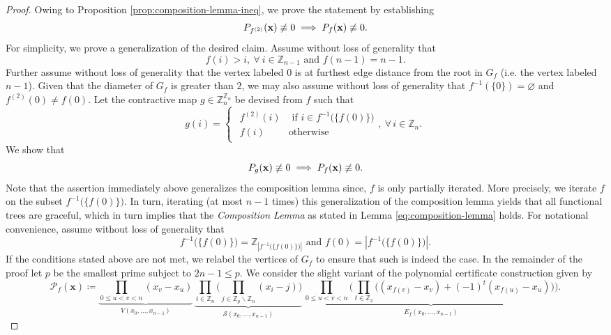 \begin{proof}
Owing to Proposition \ref{prop:composition-lemma-ineq}, we prove the statement by establishing 
\[
    P_{f^{(2)}} ({\bf x}) \not\equiv 0  \implies  P_{f} ({\bf x}) \not\equiv 0.
\]
For simplicity, we prove a generalization of the desired claim. Assume without loss of generality that
\[
f(i)>i,\ \forall\:i\in\mathbb{Z}_{n-1}\text{  and  }f(n-1)=n-1.
\]
Further assume without loss of generality that the vertex labeled $0$ is at furthest edge distance from the root in $G_f$ (i.e. the vertex labeled $n-1$). Given that the diameter of $G_{f}$ is greater than $2$, we may also assume without loss of generality that  $f^{-1}\left(\{0\}\right)=\varnothing$
and $f^{(2)}(0)\ne f(0)$. Let the contractive
map $g\in\mathbb{Z}_{n}^{\mathbb{Z}_{n}}$ be devised from $f$ such that 
\begin{equation}
g(i)=\begin{cases}
\begin{array}{cc}
f^{(2)}(i) & \text{ if }i\in f^{-1}\big(\{f(0)\}\big)\\
f(i) & \text{otherwise}
\end{array},\ \forall\,i\in\mathbb{Z}_{n}.\end{cases}
\end{equation}
We show that
\begin{equation} \label{eq:composition-lemma-generalized}
P_{g} ({\bf x}) \not\equiv 0  \implies  P_{f} ({\bf x}) \not\equiv 0.
\end{equation}
Note that the assertion immediately above generalizes the composition
lemma since, $f$ is only partially
iterated. More precisely, we iterate $f$ on the subset $f^{-1}\big(\{f(0)\}\big)$.
In turn, iterating (at most $n-1$ times) this generalization  of the composition lemma yields
that all functional trees are graceful, which in turn implies that the \textit{Composition Lemma} as stated in Lemma \ref{eq:composition-lemma}  holds. For notational convenience, assume without loss of generality that 
\begin{equation}
f^{-1}\big(\{f(0)\}\big)=\mathbb{Z}_{\left|f^{-1}\big(\{f(0)\}\big)\right|}\text{  and  }f(0)=\left|f^{-1}\big(\{f(0)\}\big)\right|.
\end{equation}
If the conditions stated above are not met, we relabel the vertices of $G_f$ to ensure that such is indeed the case. In the remainder of the proof let $p$ be the smallest prime subject to $2n-1\le p$. We consider the slight variant of the polynomial certificate construction given by
\[
\mathcal{P}_{f}(\mathbf{x})\coloneq\underbrace{\prod_{0\le u<v<n}(x_{v}-x_{u})}_{V(x_{0},\ldots,x_{n-1})}\,\underbrace{\prod_{i\in\mathbb{Z}_{n}}\big(\prod_{j\in\mathbb{Z}_{p}\backslash\mathbb{Z}_{n}}(x_{i}-j)\big)}_{\mathcal{S}(x_{0},\ldots,x_{n-1})}\,\underbrace{\prod_{0\le u<v<n}\bigg(\prod_{t\in\mathbb{Z}_{2}}\big((x_{f(v)}-x_{v})+(-1)^{t}(x_{f(u)}-x_{u})\big)\bigg)}_{E_{f}(x_{0},\ldots,x_{n-1})}.
\]
\end{proof}

